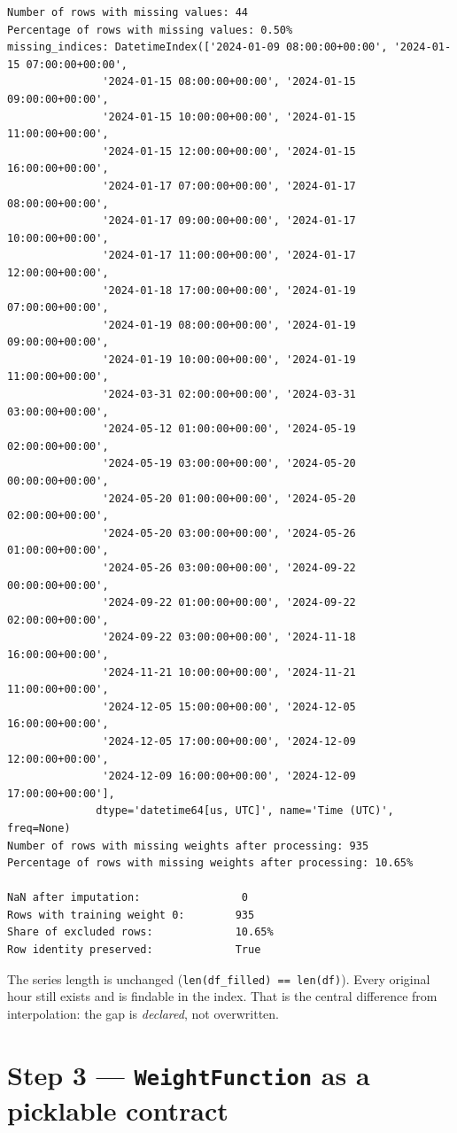 \documentclass[
  english,
  letterpaper,
]{scrbook}
\begin{document}
\begin{verbatim}
Number of rows with missing values: 44
Percentage of rows with missing values: 0.50%
missing_indices: DatetimeIndex(['2024-01-09 08:00:00+00:00', '2024-01-15 07:00:00+00:00',
               '2024-01-15 08:00:00+00:00', '2024-01-15 09:00:00+00:00',
               '2024-01-15 10:00:00+00:00', '2024-01-15 11:00:00+00:00',
               '2024-01-15 12:00:00+00:00', '2024-01-15 16:00:00+00:00',
               '2024-01-17 07:00:00+00:00', '2024-01-17 08:00:00+00:00',
               '2024-01-17 09:00:00+00:00', '2024-01-17 10:00:00+00:00',
               '2024-01-17 11:00:00+00:00', '2024-01-17 12:00:00+00:00',
               '2024-01-18 17:00:00+00:00', '2024-01-19 07:00:00+00:00',
               '2024-01-19 08:00:00+00:00', '2024-01-19 09:00:00+00:00',
               '2024-01-19 10:00:00+00:00', '2024-01-19 11:00:00+00:00',
               '2024-03-31 02:00:00+00:00', '2024-03-31 03:00:00+00:00',
               '2024-05-12 01:00:00+00:00', '2024-05-19 02:00:00+00:00',
               '2024-05-19 03:00:00+00:00', '2024-05-20 00:00:00+00:00',
               '2024-05-20 01:00:00+00:00', '2024-05-20 02:00:00+00:00',
               '2024-05-20 03:00:00+00:00', '2024-05-26 01:00:00+00:00',
               '2024-05-26 03:00:00+00:00', '2024-09-22 00:00:00+00:00',
               '2024-09-22 01:00:00+00:00', '2024-09-22 02:00:00+00:00',
               '2024-09-22 03:00:00+00:00', '2024-11-18 16:00:00+00:00',
               '2024-11-21 10:00:00+00:00', '2024-11-21 11:00:00+00:00',
               '2024-12-05 15:00:00+00:00', '2024-12-05 16:00:00+00:00',
               '2024-12-05 17:00:00+00:00', '2024-12-09 12:00:00+00:00',
               '2024-12-09 16:00:00+00:00', '2024-12-09 17:00:00+00:00'],
              dtype='datetime64[us, UTC]', name='Time (UTC)', freq=None)
Number of rows with missing weights after processing: 935
Percentage of rows with missing weights after processing: 10.65%

NaN after imputation:                0
Rows with training weight 0:        935
Share of excluded rows:             10.65%
Row identity preserved:             True
\end{verbatim}

The series length is unchanged (\texttt{len(df\_filled)\ ==\ len(df)}).
Every original hour still exists and is findable in the index. That is
the central difference from interpolation: the gap is \emph{declared},
not overwritten.

\section{\texorpdfstring{Step 3 --- \texttt{WeightFunction} as a
picklable
contract}{Step 3 --- WeightFunction as a picklable contract}}\label{step-3-weightfunction-as-a-picklable-contract}
\end{document}
